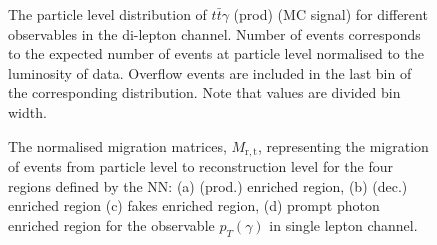 \begin{figure}[ht]
    \caption{The particle level distribution of $t\bar{t}\gamma$ (prod) (MC signal) for different observables in the di-lepton channel. Number of events corresponds to the expected number of events at particle level normalised to the luminosity of data. Overflow events are included in the last bin of the corresponding distribution.
    Note that values are divided bin width.}
    \label{fig:folding_input_dilep1}
\end{figure}
\FloatBarrier


\begin{figure}[ht]
    \centering
    \quad\quad
    \quad\quad
    \quad\quad
    \quad\quad
    \caption{The normalised migration matrices, $M_{\mathrm{r,t}}$, representing the migration of events from particle level to reconstruction level  for the four regions defined by the NN: (a) \tty (prod.) enriched region, (b) \tty (dec.) enriched region
    (c) fakes enriched region, (d) prompt photon enriched region for the observable $p_T(\gamma)$ in single lepton channel.}
    \label{fig:folding_input_migration_ljet}
\end{figure}
\FloatBarrier

